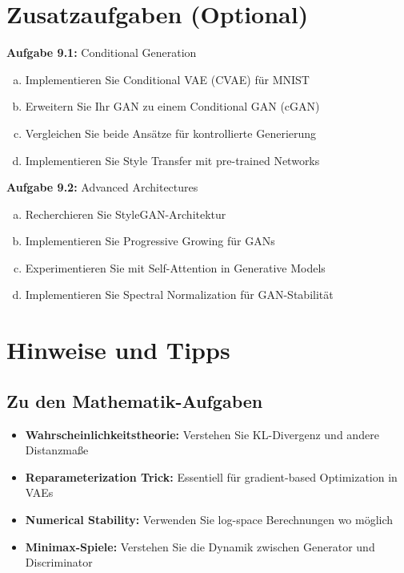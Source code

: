 \documentclass[12pt,a4paper]{article}
\begin{document}
\section{Zusatzaufgaben (Optional)}

\textbf{Aufgabe 9.1:} Conditional Generation

\begin{enumerate}[(a)]
    \item Implementieren Sie Conditional VAE (CVAE) für MNIST
    \item Erweitern Sie Ihr GAN zu einem Conditional GAN (cGAN)
    \item Vergleichen Sie beide Ansätze für kontrollierte Generierung
    \item Implementieren Sie Style Transfer mit pre-trained Networks
\end{enumerate}

\textbf{Aufgabe 9.2:} Advanced Architectures

\begin{enumerate}[(a)]
    \item Recherchieren Sie StyleGAN-Architektur
    \item Implementieren Sie Progressive Growing für GANs
    \item Experimentieren Sie mit Self-Attention in Generative Models
    \item Implementieren Sie Spectral Normalization für GAN-Stabilität
\end{enumerate}

\section*{Hinweise und Tipps}

\subsection*{Zu den Mathematik-Aufgaben}
\begin{itemize}
    \item \textbf{Wahrscheinlichkeitstheorie:} Verstehen Sie KL-Divergenz und andere Distanzmaße
    \item \textbf{Reparameterization Trick:} Essentiell für gradient-based Optimization in VAEs
    \item \textbf{Numerical Stability:} Verwenden Sie log-space Berechnungen wo möglich
    \item \textbf{Minimax-Spiele:} Verstehen Sie die Dynamik zwischen Generator und Discriminator
\end{itemize}
\end{document}
